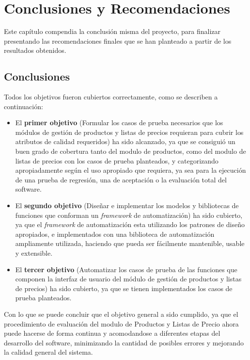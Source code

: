 \chapter{Conclusiones y Recomendaciones}

Este capítulo compendia la conclusión misma del proyecto, para finalizar
presentando las recomendaciones finales que se han planteado a partir de los
resultados obtenidos.

\section{Conclusiones}
Todos los objetivos fueron cubiertos correctamente, como se describen a
continuación:

\begin{itemize}
\item El \textbf{primer objetivo} (Formular los casos de prueba necesarios que
los módulos de gestión de productos y listas de precios requieran para cubrir
los atributos de calidad requeridos) ha sido alcanzado, ya que se consiguió un
buen grado de cobertura tanto del modulo de productos, como del modulo de listas
de precios con los casos de prueba planteados, y categorizando apropiadamente
según el uso apropiado que requiera, ya sea para la ejecución de una prueba de
regresión, una de aceptación o la evaluación total del software.
\item El \textbf{segundo objetivo} (Diseñar e implementar los modelos y
bibliotecas de funciones que conforman un \emph{framework} de automatización)
ha sido cubierto, ya que el \emph{framework} de automatización esta utilizando
los patrones de diseño apropiados, e implementados con una biblioteca de
automatización ampliamente utilizada, haciendo que pueda ser fácilmente
mantenible, usable y extensible.
\item El \textbf{tercer objetivo} (Automatizar los casos de prueba de las
funciones que componen la interfaz de usuario del módulo de gestión de productos
y listas de precios) ha sido cubierto, ya que se tienen implementados los casos
de prueba planteados.
\end{itemize}

Con lo que se puede concluir que el objetivo general a sido cumplido, ya que el
procedimiento de evaluación del modulo de Productos y Listas de Precio ahora
puede hacerse de forma continua y acomodandose a diferentes etapas del
desarrollo del software, minimizando la cantidad de posibles errores y mejorando
la calidad general del sistema.

